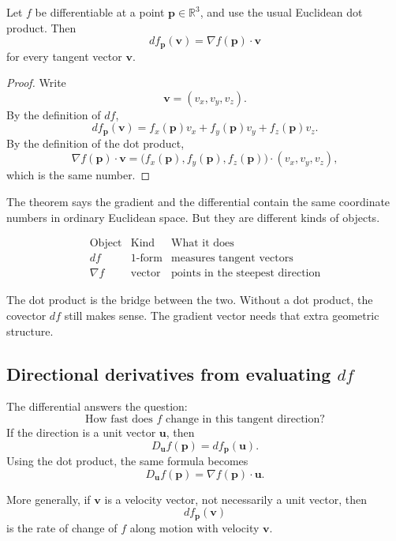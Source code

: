 \begin{theorem}
Let \(f\) be differentiable at a point \(\mathbf p\in\mathbb R^3\), and use the usual
Euclidean dot product.  Then
\[
\boxed{
    df_{\mathbf p}(\mathbf v)=\nabla f(\mathbf p)\cdot\mathbf v
}
\]
for every tangent vector \(\mathbf v\).
\end{theorem}

\begin{proof}
Write
\[
    \mathbf v=(v_x,v_y,v_z).
\]
By the definition of \(df\),
\[
    df_{\mathbf p}(\mathbf v)
    =
    f_x(\mathbf p)v_x+f_y(\mathbf p)v_y+f_z(\mathbf p)v_z.
\]
By the definition of the dot product,
\[
    \nabla f(\mathbf p)\cdot\mathbf v
    =
    \bigl(f_x(\mathbf p),f_y(\mathbf p),f_z(\mathbf p)\bigr)
    \cdot
    (v_x,v_y,v_z),
\]
which is the same number.
\end{proof}

The theorem says the gradient and the differential contain the same coordinate
numbers in ordinary Euclidean space.  But they are different kinds of objects.

\[
\begin{array}{c|c|c}
\text{Object} & \text{Kind} & \text{What it does} \\ \hline
df & 1\text{-form} & \text{measures tangent vectors}\\[1mm]
\nabla f & \text{vector} & \text{points in the steepest direction}
\end{array}
\]

The dot product is the bridge between the two.  Without a dot product, the covector
\(df\) still makes sense.  The gradient vector needs that extra geometric structure.

\subsection{Directional derivatives from evaluating \texorpdfstring{\(df\)}{df}}

The differential answers the question:
\[
    \text{How fast does \(f\) change in this tangent direction?}
\]
If the direction is a unit vector \(\mathbf u\), then
\[
\boxed{
    D_{\mathbf u}f(\mathbf p)=df_{\mathbf p}(\mathbf u).
}
\]
Using the dot product, the same formula becomes
\[
\boxed{
    D_{\mathbf u}f(\mathbf p)=\nabla f(\mathbf p)\cdot\mathbf u.
}
\]

More generally, if \(\mathbf v\) is a velocity vector, not necessarily a unit vector, then
\[
    df_{\mathbf p}(\mathbf v)
\]
is the rate of change of \(f\) along motion with velocity \(\mathbf v\).

